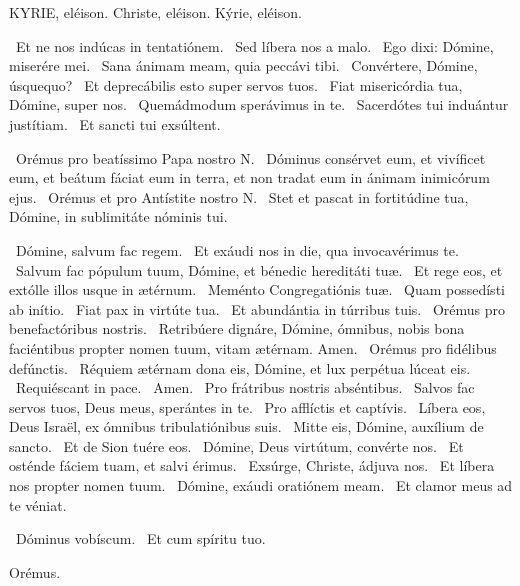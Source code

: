 KYRIE, eléison. Christe, eléison. Kýrie, eléison.

 \V\ Et ne nos indúcas in tentatiónem. \R\ Sed líbera nos a malo. \V\ Ego dixi: Dómine, miserére mei. \R\ Sana ánimam meam, quia peccávi tibi. \V\ Convértere, Dómine, úsquequo? \R\ Et deprecábilis esto super servos tuos. \V\ Fiat misericórdia tua, Dómine, super nos. \R\ Quemádmodum sperávimus in te. \V\ Sacerdótes tui induántur justítiam. \R\ Et sancti tui exsúltent.

\V\ Orémus pro beatíssimo Papa nostro N. \R\ Dóminus consérvet eum, et vivíficet eum, et beátum fáciat eum in terra, et non tradat eum in ánimam inimicórum ejus. \V\ Orémus et pro Antístite nostro N. \R\ Stet et pascat in fortitúdine tua, Dómine, in sublimitáte nóminis tui.


\V\ Dómine, salvum fac regem. \R\ Et exáudi nos in die, qua invocavérimus te. \V\ Salvum fac pópulum tuum, Dómine, et bénedic hereditáti tuæ. \R\ Et rege eos, et extólle illos usque in ætérnum. \V\ Meménto Congregatiónis tuæ. \R\ Quam possedísti ab inítio. \V\ Fiat pax in virtúte tua. \R\ Et abundántia in túrribus tuis. \V\ Orémus pro benefactóribus nostris. \R\ Retribúere dignáre, Dómine, ómnibus, nobis bona faciéntibus propter nomen tuum, vitam ætérnam. Amen. \V\ Orémus pro fidélibus defúnctis. \R\ Réquiem ætérnam dona eis, Dómine, et lux perpétua lúceat eis. \V\ Requiéscant in pace. \R\ Amen. \V\ Pro frátribus nostris abséntibus. \R\ Salvos fac servos tuos, Deus meus, sperántes in te. \V\ Pro afflíctis et captívis. \R\ Líbera eos, Deus Israël, ex ómnibus tribulatiónibus suis. \V\ Mitte eis, Dómine, auxílium de sancto. \R\ Et de Sion tuére eos. \V\ Dómine, Deus virtútum, convérte nos. \R\ Et osténde fáciem tuam, et salvi érimus. \V\ Exsúrge, Christe, ádjuva nos. \R\ Et líbera nos propter nomen tuum. \V\ Dómine, exáudi oratiónem meam. \R\ Et clamor meus ad te véniat.


\V\ Dóminus vobíscum. \R\ Et cum spíritu tuo.

Orémus.

